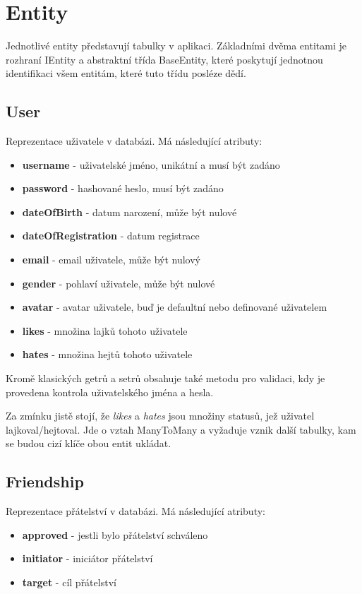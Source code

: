 \documentclass[
12pt,
a4paper,
pdftex,
czech,
titlepage
]{report}
\begin{document}
\section{Entity}

Jednotlivé entity představují tabulky v aplikaci. Základními dvěma entitami je rozhraní IEntity a abstraktní třída BaseEntity, které poskytují jednotnou identifikaci všem entitám, které tuto třídu posléze dědí.

\subsection{User}

Reprezentace uživatele v databázi. Má následující atributy:
\begin{itemize}
\item \textbf{username} - uživatelské jméno, unikátní a musí být zadáno
\item \textbf{password} - hashované heslo, musí být zadáno
\item \textbf{dateOfBirth} - datum narození, může být nulové
\item \textbf{dateOfRegistration} - datum registrace
\item \textbf{email} - email uživatele, může být nulový
\item \textbf{gender} - pohlaví uživatele, může být nulové
\item \textbf{avatar} - avatar uživatele, buď je defaultní nebo definované uživatelem
\item \textbf{likes} - množina lajků tohoto uživatele
\item \textbf{hates} - množina hejtů tohoto uživatele
\end{itemize}

Kromě klasických getrů a setrů obsahuje také metodu pro validaci, kdy je provedena kontrola uživatelského jména a hesla. 

Za zmínku jistě stojí, že \textit{likes} a \textit{hates} jsou množiny statusů, jež uživatel lajkoval/hejtoval. Jde o vztah ManyToMany a vyžaduje vznik další tabulky, kam se budou cizí klíče obou entit ukládat.

\subsection{Friendship}

Reprezentace přátelství v databázi. Má následující atributy:

\begin{itemize}
\item \textbf{approved} - jestli bylo přátelství schváleno
\item \textbf{initiator} - iniciátor přátelství
\item \textbf{target} - cíl přátelství
\end{itemize}
\end{document}
